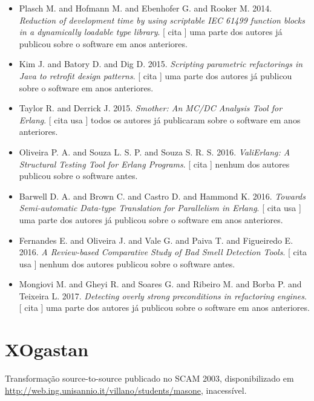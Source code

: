 \begin{itemize}
      [
          cita
          usa
          contribui
      ]
uma parte dos autores já publicou sobre o software em anos anteriores.
\item Plasch M. and Hofmann M. and Ebenhofer G. and Rooker M.
      2014.
        \textit{ Reduction of development time by using scriptable IEC 61499 function blocks in a dynamically loadable type library}.
      [
          cita
      ]
uma parte dos autores já publicou sobre o software em anos anteriores.
\item Kim J. and Batory D. and Dig D.
      2015.
        \textit{ Scripting parametric refactorings in Java to retrofit design patterns}.
      [
          cita
      ]
uma parte dos autores já publicou sobre o software em anos anteriores.
\item Taylor R. and Derrick J.
      2015.
        \textit{ Smother: An MC/DC Analysis Tool for Erlang}.
      [
          cita
          usa
      ]
todos os autores já publicaram sobre o software em anos anteriores.
\item Oliveira P. A. and Souza L. S. P. and Souza S. R. S.
      2016.
        \textit{ ValiErlang: A Structural Testing Tool for Erlang Programs}.
      [
          cita
      ]
nenhum dos autores publicou sobre o software antes.
\item Barwell D. A. and Brown C. and Castro D. and Hammond K.
      2016.
        \textit{ Towards Semi-automatic Data-type Translation for Parallelism in Erlang}.
      [
          cita
          usa
      ]
uma parte dos autores já publicou sobre o software em anos anteriores.
\item Fernandes E. and Oliveira J. and Vale G. and Paiva T. and Figueiredo E.
      2016.
        \textit{ A Review-based Comparative Study of Bad Smell Detection Tools}.
      [
          cita
          usa
      ]
nenhum dos autores publicou sobre o software antes.
\item Mongiovi M. and Gheyi R. and Soares G. and Ribeiro M. and Borba P. and Teixeira L.
      2017.
        \textit{ Detecting overly strong preconditions in refactoring engines}.
      [
          cita
      ]
uma parte dos autores já publicou sobre o software em anos anteriores.
\end{itemize}
\section{XOgastan}

Transformação source-to-source
publicado no SCAM 2003,
disponibilizado em \url{http://web.ing.unisannio.it/villano/students/masone},
inacessível.

